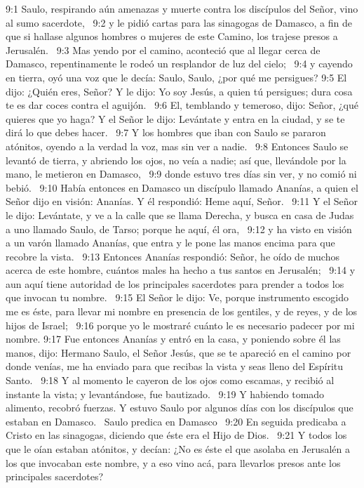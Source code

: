 9:1 Saulo, respirando aún amenazas y muerte contra los discípulos del Señor, vino al sumo sacerdote,  
9:2 y le pidió cartas para las sinagogas de Damasco, a fin de que si hallase algunos hombres o mujeres de este Camino, los trajese presos a Jerusalén.  
9:3 Mas yendo por el camino, aconteció que al llegar cerca de Damasco, repentinamente le rodeó un resplandor de luz del cielo;  
9:4 y cayendo en tierra, oyó una voz que le decía: Saulo, Saulo, ¿por qué me persigues? 
9:5 El dijo: ¿Quién eres, Señor? Y le dijo: Yo soy Jesús, a quien tú persigues; dura cosa te es dar coces contra el aguijón.  
9:6 El, temblando y temeroso, dijo: Señor, ¿qué quieres que yo haga? Y el Señor le dijo: Levántate y entra en la ciudad, y se te dirá lo que debes hacer.  
9:7 Y los hombres que iban con Saulo se pararon atónitos, oyendo a la verdad la voz, mas sin ver a nadie.  
9:8 Entonces Saulo se levantó de tierra, y abriendo los ojos, no veía a nadie; así que, llevándole por la mano, le metieron en Damasco,  
9:9 donde estuvo tres días sin ver, y no comió ni bebió.  
9:10 Había entonces en Damasco un discípulo llamado Ananías, a quien el Señor dijo en visión: Ananías. Y él respondió: Heme aquí, Señor.  
9:11 Y el Señor le dijo: Levántate, y ve a la calle que se llama Derecha, y busca en casa de Judas a uno llamado Saulo, de Tarso; porque he aquí, él ora,  
9:12 y ha visto en visión a un varón llamado Ananías, que entra y le pone las manos encima para que recobre la vista.  
9:13 Entonces Ananías respondió: Señor, he oído de muchos acerca de este hombre, cuántos males ha hecho a tus santos en Jerusalén;  
9:14 y aun aquí tiene autoridad de los principales sacerdotes para prender a todos los que invocan tu nombre.  
9:15 El Señor le dijo: Ve, porque instrumento escogido me es éste, para llevar mi nombre en presencia de los gentiles, y de reyes, y de los hijos de Israel;  
9:16 porque yo le mostraré cuánto le es necesario padecer por mi nombre. 
9:17 Fue entonces Ananías y entró en la casa, y poniendo sobre él las manos, dijo: Hermano Saulo, el Señor Jesús, que se te apareció en el camino por donde venías, me ha enviado para que recibas la vista y seas lleno del Espíritu Santo.  
9:18 Y al momento le cayeron de los ojos como escamas, y recibió al instante la vista; y levantándose, fue bautizado.  
9:19 Y habiendo tomado alimento, recobró fuerzas. Y estuvo Saulo por algunos días con los discípulos que estaban en Damasco.  
Saulo predica en Damasco  
9:20 En seguida predicaba a Cristo en las sinagogas, diciendo que éste era el Hijo de Dios.  
9:21 Y todos los que le oían estaban atónitos, y decían: ¿No es éste el que asolaba en Jerusalén a los que invocaban este nombre, y a eso vino acá, para llevarlos presos ante los principales sacerdotes?  
